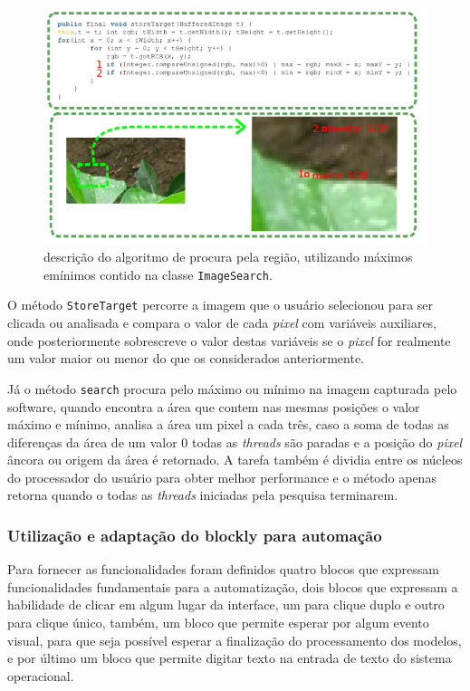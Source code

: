 \documentclass[tg]{mdtufsm}
\begin{document}
                    \begin{figure}[!htb]
                        {\centering
                        \includegraphics[width=1.0\textwidth]{imagens/codeImageA.png}
                        \caption{descrição do algoritmo de procura pela região, utilizando máximos emínimos contido na classe \texttt{ImageSearch}.}
                        \label{fig:ImageSearch}}
                    \end{figure}

                    O método \texttt{StoreTarget} percorre a imagem que o usuário selecionou para ser clicada ou analisada e compara o valor de cada \emph{pixel} com variáveis auxiliares, onde posteriormente sobrescreve o valor destas variáveis se o \emph{pixel} for realmente um valor maior ou menor do que os considerados anteriormente.

                    Já o método \texttt{search} procura pelo máximo ou mínimo na imagem capturada pelo software, quando encontra a área que contem nas mesmas posições o valor máximo e mínimo, analisa a área um pixel a cada três, caso a soma de todas as diferenças da área de um valor 0 todas as \emph{threads} são paradas e a posição do \emph{pixel} âncora ou origem da área é retornado. A tarefa também é dividia entre os núcleos do processador do usuário para obter melhor performance e o método apenas retorna quando o todas as \emph{threads} iniciadas pela pesquisa terminarem.

                \subsubsection {Utilização e adaptação do blockly para automação}

                    Para fornecer as funcionalidades foram definidos quatro blocos que expressam funcionalidades fundamentais para a automatização, dois blocos que expressam a habilidade de clicar em algum lugar da interface, um para clique duplo e outro para clique único, também, um bloco que permite esperar por algum evento visual, para que seja possível esperar a finalização do processamento dos modelos, e por último um bloco que permite digitar texto na entrada de texto do sistema operacional.
\end{document}
